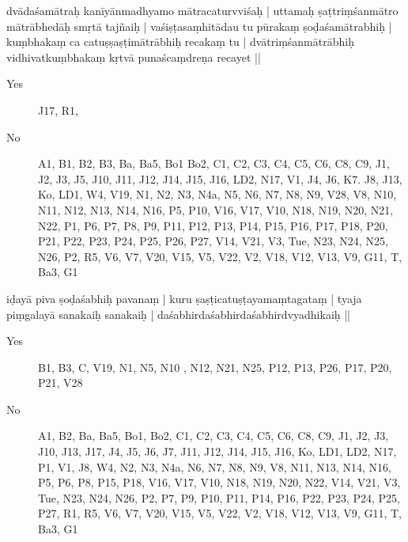 \begin{marma}[hp02_009]
dvādaśamātraḥ kanīyānmadhyamo mātracaturvviśaḥ |
uttamaḥ ṣaṭtriṃśanmātro mātrābhedāḥ smṛtā tajñaiḥ |
vaśiṣṭasaṃhitādau tu pūrakaṃ ṣoḍaśamātrabhiḥ |
kuṃbhakaṃ ca catuṣṣaṣṭimātrābhiḥ recakaṃ tu |
dvātriṃśanmātrābhiḥ vidhivatkuṃbhakaṃ kṛtvā punaścaṃdreṇa recayet ||
\begin{description}
\item[Yes] J17, R1, 
\item[No] A1, B1, B2, B3, Ba, Ba5, Bo1 Bo2, C1, C2, C3, C4, C5, C6, C8, C9, J1, J2, J3, J5, J10, J11, J12, J14, J15, J16, LD2, N17, V1, J4, J6, K7. J8, J13, Ko, LD1, W4, V19, N1, N2, N3, N4a, N5, N6, N7, N8, N9, V28, V8, N10, N11, N12, N13, N14, N16, P5, P10, V16, V17, V10, N18, N19, N20, N21, N22, P1, P6, P7, P8, P9, P11, P12, P13, P14, P15, P16, P17, P18, P20, P21, P22, P23, P24, P25, P26, P27, V14, V21, V3, Tue, N23, N24, N25, N26, P2, R5, V6, V7, V20, V15, V5, V22, V2, V18, V12, V13, V9, G11, T, Ba3, G1
    \end{description}

\begin{marma}[hp02_011]
iḍayā piva ṣoḍaśabhiḥ pavanaṃ |
kuru ṣaṣṭicatuṣṭayamaṃtagataṃ |
tyaja piṃgalayā sanakaiḥ sanakaiḥ |
daśabhirdaśabhirdaśabhirdvyadhikaiḥ ||
\begin{description}
\item[Yes] B1, B3, C, V19, N1, N5, N10 , N12, N21, N25, P12, P13, P26, P17, P20, P21, V28
\item[No] A1, B2, Ba, Ba5, Bo1, Bo2, C1, C2, C3, C4, C5, C6, C8, C9, J1, J2, J3, J10, J13, J17, J4, J5, J6, J7, J11, J12, J14, J15, J16, Ko, LD1, LD2, N17, P1, V1, J8, W4, N2, N3, N4a, N6, N7, N8, N9, V8, N11, N13, N14, N16, P5, P6, P8, P15, P18, V16, V17, V10, N18, N19, N20, N22, V14, V21, V3, Tue, N23, N24, N26, P2, P7, P9, P10, P11, P14, P16, P22, P23, P24, P25, P27, R1, R5, V6, V7, V20, V15, V5, V22, V2, V18, V12, V13, V9, G11, T, Ba3, G1
    \end{description}



\end{marma}
\end{marma}
